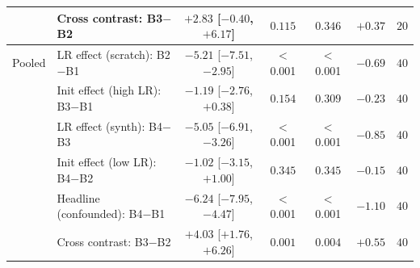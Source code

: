\begin{table}[ht]
\begin{tabular}{llccccc}
 & Cross contrast: B3$-$B2 & $+2.83$ [$-0.40$, $+6.17$] & $0.115$ & $0.346$ & $+0.37$ & $20$ \\
\midrule
Pooled & LR effect (scratch): B2$-$B1 & $-5.21$ [$-7.51$, $-2.95$] & $<$0.001 & $<$0.001 & $-0.69$ & $40$ \\
 & Init effect (high LR): B3$-$B1 & $-1.19$ [$-2.76$, $+0.38$] & $0.154$ & $0.309$ & $-0.23$ & $40$ \\
 & LR effect (synth): B4$-$B3 & $-5.05$ [$-6.91$, $-3.26$] & $<$0.001 & $<$0.001 & $-0.85$ & $40$ \\
 & Init effect (low LR): B4$-$B2 & $-1.02$ [$-3.15$, $+1.00$] & $0.345$ & $0.345$ & $-0.15$ & $40$ \\
 & Headline (confounded): B4$-$B1 & $-6.24$ [$-7.95$, $-4.47$] & $<$0.001 & $<$0.001 & $-1.10$ & $40$ \\
 & Cross contrast: B3$-$B2 & $+4.03$ [$+1.76$, $+6.26$] & $0.001$ & $0.004$ & $+0.55$ & $40$ \\
\bottomrule
\end{tabular}
\end{table}
